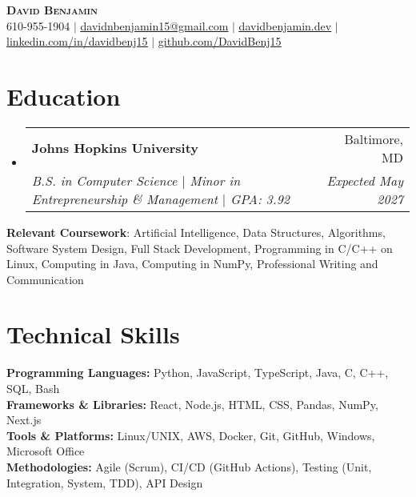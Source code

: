 \documentclass[letterpaper,10pt]{article}
\makeatletter
\newcommand{\resumeItem}[1]{
  \item\small{
    {#1 \vspace{-2pt}}
  }
}
\newcommand{\resumeSubheading}[4]{
  \vspace{-2pt}\item
    \begin{tabular*}{0.97\textwidth}[t]{l@{\extracolsep{\fill}}r}
      \textbf{#1} & #2 \\
      \textit{\small#3} & \textit{\small #4} \\
    \end{tabular*}\vspace{-7pt}
}
\newcommand{\resumeSubHeadingListStart}{\begin{itemize}[leftmargin=0.15in, label={}]}
\newcommand{\resumeSubHeadingListEnd}{\end{itemize}}
\newcommand{\resumeItemListStart}{\begin{itemize}}
\newcommand{\resumeItemListEnd}{\end{itemize}\vspace{-5pt}}
\makeatother
\begin{document}
\begin{center}
    \textbf{\Huge \scshape David Benjamin} \\ \vspace{1pt}
    \small 610-955-1904 $|$ \href{mailto:davidnbenjamin15@gmail.com}{\underline{davidnbenjamin15@gmail.com}} $|$ 
    \href{https://davidbenjamin.dev}{\underline{davidbenjamin.dev}} $|$
    \href{https://www.linkedin.com/in/davidbenj15/}{\underline{linkedin.com/in/davidbenj15}} $|$
    \href{https://github.com/DavidBenj15}{\underline{github.com/DavidBenj15}}
\end{center}

\section{Education}
  \resumeSubHeadingListStart
    \resumeSubheading
      {Johns Hopkins University}{Baltimore, MD}
      {B.S. in Computer Science $|$ Minor in Entrepreneurship \& Management $|$ GPA: 3.92}{Expected May 2027}
  \resumeSubHeadingListEnd


    \begin{itemize}[leftmargin=0.15in, label={}]
    \small{
        \item{
            \textbf{Relevant Coursework}: Artificial Intelligence, Data Structures, Algorithms, Software System Design, Full Stack Development, Programming in C/C++ on Linux, Computing in Java, Computing in NumPy, Professional Writing and Communication
        }
    }
\end{itemize}

\section{Technical Skills}
\begin{itemize}[leftmargin=0.15in, label={}]
    \small{
        \item{
            \textbf{Programming Languages:} Python, JavaScript, TypeScript, Java, C, C++, SQL, Bash \\
            \textbf{Frameworks \& Libraries:} React, Node.js, HTML, CSS, Pandas, NumPy, Next.js \\
            \textbf{Tools \& Platforms:} Linux/UNIX, AWS, Docker, Git, GitHub, Windows, Microsoft Office \\
            \textbf{Methodologies:} Agile (Scrum), CI/CD (GitHub Actions), Testing (Unit, Integration, System, TDD), API Design
        }
    }
\end{itemize}
\end{document}

